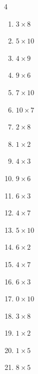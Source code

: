 \begin{multicols}{4}
\begin{enumerate}
  \item $3\times 8$
        \phantom{$=24$}

  \item $5\times 10$
        \phantom{$=50$}

  \item $4\times 9$
        \phantom{$=36$}

  \item $9\times 6$
        \phantom{$=54$}

  \item $7\times 10$
        \phantom{$=70$}

  \item $10\times 7$
        \phantom{$=70$}

  \item $2\times 8$
        \phantom{$=16$}

  \item $1\times 2$
        \phantom{$=2$}

  \item $4\times 3$
        \phantom{$=12$}

  \item $9\times 6$
        \phantom{$=54$}

  \item $6\times 3$
        \phantom{$=18$}

  \item $4\times 7$
        \phantom{$=28$}

  \item $5\times 10$
        \phantom{$=50$}

  \item $6\times 2$
        \phantom{$=12$}

  \item $4\times 7$
        \phantom{$=28$}

  \item $6\times 3$
        \phantom{$=18$}

  \item $0\times 10$
        \phantom{$=0$}

  \item $3\times 8$
        \phantom{$=24$}

  \item $1\times 2$
        \phantom{$=2$}

\columnbreak %

  \item $1\times 5$
        \phantom{$=5$}

  \item $8\times 5$
        \phantom{$=40$}


\end{enumerate}
\end{multicols}

